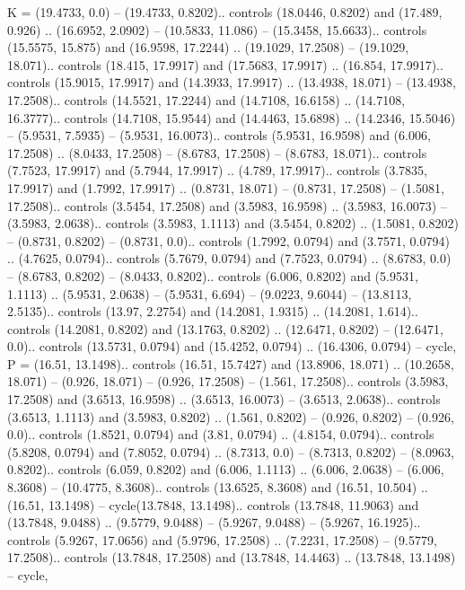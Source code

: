 {K} = {(19.4733, 0.0) -- (19.4733, 0.8202).. controls (18.0446, 0.8202) and (17.489, 0.926) .. (16.6952, 2.0902) -- (10.5833, 11.086) -- (15.3458, 15.6633).. controls (15.5575, 15.875) and (16.9598, 17.2244) .. (19.1029, 17.2508) -- (19.1029, 18.071).. controls (18.415, 17.9917) and (17.5683, 17.9917) .. (16.854, 17.9917).. controls (15.9015, 17.9917) and (14.3933, 17.9917) .. (13.4938, 18.071) -- (13.4938, 17.2508).. controls (14.5521, 17.2244) and (14.7108, 16.6158) .. (14.7108, 16.3777).. controls (14.7108, 15.9544) and (14.4463, 15.6898) .. (14.2346, 15.5046) -- (5.9531, 7.5935) -- (5.9531, 16.0073).. controls (5.9531, 16.9598) and (6.006, 17.2508) .. (8.0433, 17.2508) -- (8.6783, 17.2508) -- (8.6783, 18.071).. controls (7.7523, 17.9917) and (5.7944, 17.9917) .. (4.789, 17.9917).. controls (3.7835, 17.9917) and (1.7992, 17.9917) .. (0.8731, 18.071) -- (0.8731, 17.2508) -- (1.5081, 17.2508).. controls (3.5454, 17.2508) and (3.5983, 16.9598) .. (3.5983, 16.0073) -- (3.5983, 2.0638).. controls (3.5983, 1.1113) and (3.5454, 0.8202) .. (1.5081, 0.8202) -- (0.8731, 0.8202) -- (0.8731, 0.0).. controls (1.7992, 0.0794) and (3.7571, 0.0794) .. (4.7625, 0.0794).. controls (5.7679, 0.0794) and (7.7523, 0.0794) .. (8.6783, 0.0) -- (8.6783, 0.8202) -- (8.0433, 0.8202).. controls (6.006, 0.8202) and (5.9531, 1.1113) .. (5.9531, 2.0638) -- (5.9531, 6.694) -- (9.0223, 9.6044) -- (13.8113, 2.5135).. controls (13.97, 2.2754) and (14.2081, 1.9315) .. (14.2081, 1.614).. controls (14.2081, 0.8202) and (13.1763, 0.8202) .. (12.6471, 0.8202) -- (12.6471, 0.0).. controls (13.5731, 0.0794) and (15.4252, 0.0794) .. (16.4306, 0.0794) -- cycle},
{P} = {(16.51, 13.1498).. controls (16.51, 15.7427) and (13.8906, 18.071) .. (10.2658, 18.071) -- (0.926, 18.071) -- (0.926, 17.2508) -- (1.561, 17.2508).. controls (3.5983, 17.2508) and (3.6513, 16.9598) .. (3.6513, 16.0073) -- (3.6513, 2.0638).. controls (3.6513, 1.1113) and (3.5983, 0.8202) .. (1.561, 0.8202) -- (0.926, 0.8202) -- (0.926, 0.0).. controls (1.8521, 0.0794) and (3.81, 0.0794) .. (4.8154, 0.0794).. controls (5.8208, 0.0794) and (7.8052, 0.0794) .. (8.7313, 0.0) -- (8.7313, 0.8202) -- (8.0963, 0.8202).. controls (6.059, 0.8202) and (6.006, 1.1113) .. (6.006, 2.0638) -- (6.006, 8.3608) -- (10.4775, 8.3608).. controls (13.6525, 8.3608) and (16.51, 10.504) .. (16.51, 13.1498) -- cycle(13.7848, 13.1498).. controls (13.7848, 11.9063) and (13.7848, 9.0488) .. (9.5779, 9.0488) -- (5.9267, 9.0488) -- (5.9267, 16.1925).. controls (5.9267, 17.0656) and (5.9796, 17.2508) .. (7.2231, 17.2508) -- (9.5779, 17.2508).. controls (13.7848, 17.2508) and (13.7848, 14.4463) .. (13.7848, 13.1498) -- cycle},
